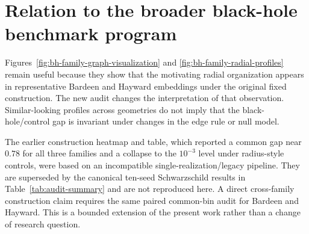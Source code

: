 \documentclass[11pt]{article}
\newcommand{\drho}{\Delta\rho_r}
\begin{document}
\begin{table}[H]
\centering
\caption{Selected paired contrasts in $|\drho|$. The contrast is protocol A
minus protocol B; intervals are two-sided Student-$t$ intervals over ten paired
seeds.}
\label{tab:paired-contrasts}
\small
{}
\end{table}

\section{Relation to the broader black-hole benchmark program}

Figures~\ref{fig:bh-family-graph-visualization} and
\ref{fig:bh-family-radial-profiles} remain useful because they show that the
motivating radial organization appears in representative Bardeen and Hayward
embeddings under the original fixed construction. The new audit changes the
interpretation of that observation. Similar-looking profiles across geometries
do not imply that the black-hole/control gap is invariant under changes in the
edge rule or null model.

The earlier construction heatmap and table, which reported a common gap near
$0.78$ for all three families and a collapse to the $10^{-3}$ level under
radius-style controls, were based on an incompatible single-realization/legacy
pipeline. They are superseded by the canonical ten-seed Schwarzschild results in
Table~\ref{tab:audit-summary} and are not reproduced here. A direct cross-family
construction claim requires the same paired common-bin audit for Bardeen and
Hayward. This is a bounded extension of the present work rather than a change of
research question.
\end{document}
